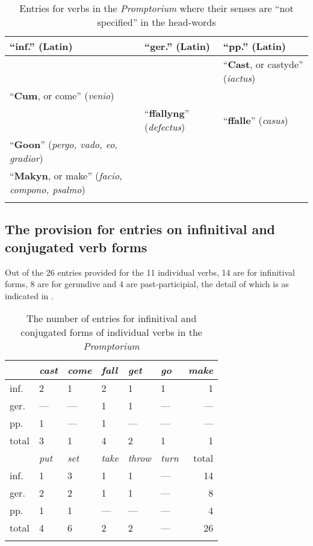\documentclass[output=paper,colorlinks,citecolor=brown,arabicfont,chinesefont]{langscibook}
\begin{document}
\begin{table}
\caption {Entries for verbs in the \textit{Promptorium} where their senses are “not specified” in the head-words}
\label{tab:miyoshi:notspecified}
\small
\begin{tabularx}{\linewidth}{ QQQ }
\lsptoprule
\textbf{“inf.” (Latin)} &\textbf{“ger.” (Latin)} & \textbf{“pp.” (Latin)} \\
\midrule
 & & “\textbf{Cast}, or castyde” (\emph{iactus}) \\
\tablevspace
“\textbf{Cum}, or come” (\emph{venio}) & &  \\
\tablevspace
 & “\textbf{ffallyng}” (\emph{defectus}) & “\textbf{ffalle}” (\emph{casus}) \\
\tablevspace
“\textbf{Goon}” (\emph{pergo, vado, eo, gradior}) & &  \\
\tablevspace
“\textbf{Makyn}, or make” (\emph{facio, compono, psalmo}) &  &  \\
\lspbottomrule
\end{tabularx}
\end{table}

\subsection{The provision for entries on infinitival and conjugated verb forms}

Out of the 26 entries provided for the 11 individual verbs, 14 are for infinitival forms, 8 are for gerundive and 4 are past-participial, the detail of which is as indicated in .

\begin{table}
\caption{The number of entries for infinitival and conjugated forms of individual verbs in the \textit{Promptorium}}
\label{tab:miyoshi:table4}
\begin{tabularx}{.8\textwidth}{ lYYYYYr }
\lsptoprule
 & \emph{cast} & \emph{come} & \emph{fall} & \emph{get} & \emph{go} & \emph{make} \\\midrule
inf. & 2 & 1 & 2 & 1 & 1 & 1 \\
ger. & --- & --- & 1 & 1 & --- & --- \\
pp. & 1 & --- & 1 & --- & --- & --- \\
total & 3 & 1 & 4 & 2 & 1 & 1 \\\midrule
 & \emph{put} & \emph{set} & \emph{take} & \emph{throw} & \emph{turn} & total \\\midrule
inf. & 1 & 3 & 1 & 1 & --- & 14 \\
ger. & 2 & 2 & 1 & 1 & --- & 8 \\
pp. & 1 & 1 & --- & --- & --- & 4 \\
total & 4 & 6 & 2 & 2 & --- & 26 \\
\lspbottomrule
\end{tabularx}
\end{table}
\end{document}
